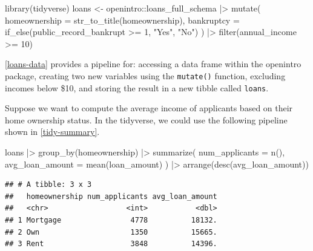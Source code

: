 \documentclass[12pt]{article}
\newenvironment{Shaded}{\begin{snugshade}}{\end{snugshade}}
\newcommand{\AttributeTok}[1]{\textcolor[rgb]{0.77,0.63,0.00}{#1}}
\newcommand{\DecValTok}[1]{\textcolor[rgb]{0.00,0.00,0.81}{#1}}
\newcommand{\FunctionTok}[1]{\textcolor[rgb]{0.00,0.00,0.00}{#1}}
\newcommand{\NormalTok}[1]{#1}
\newcommand{\OtherTok}[1]{\textcolor[rgb]{0.56,0.35,0.01}{#1}}
\newcommand{\SpecialCharTok}[1]{\textcolor[rgb]{0.00,0.00,0.00}{#1}}
\newcommand{\StringTok}[1]{\textcolor[rgb]{0.31,0.60,0.02}{#1}}
\begin{document}
\begin{Shaded}
\begin{Highlighting}[]
\FunctionTok{library}\NormalTok{(tidyverse)}
\NormalTok{loans }\OtherTok{\textless{}{-}}\NormalTok{ openintro}\SpecialCharTok{::}\NormalTok{loans\_full\_schema }\SpecialCharTok{|\textgreater{}}
  \FunctionTok{mutate}\NormalTok{(}
    \AttributeTok{homeownership =} \FunctionTok{str\_to\_title}\NormalTok{(homeownership), }
    \AttributeTok{bankruptcy =} \FunctionTok{if\_else}\NormalTok{(public\_record\_bankrupt }\SpecialCharTok{\textgreater{}=} \DecValTok{1}\NormalTok{, }\StringTok{"Yes"}\NormalTok{, }\StringTok{"No"}\NormalTok{)}
\NormalTok{  ) }\SpecialCharTok{|\textgreater{}}
  \FunctionTok{filter}\NormalTok{(annual\_income }\SpecialCharTok{\textgreater{}=} \DecValTok{10}\NormalTok{)}
\end{Highlighting}
\end{Shaded}


\label{loans-data} \linespread{2}
\vspace{3mm}\setlength{\parindent}{15pt}

\ref{loans-data} provides a pipeline for: accessing a data frame within
the openintro package, creating two new variables using the
\texttt{mutate()} function, excluding incomes below \$10, and storing
the result in a new tibble called \texttt{loans}.

Suppose we want to compute the average income of applicants based on
their home ownership status. In the tidyverse, we could use the
following pipeline shown in \ref{tidy-summary}.

\linespread{1}

\begin{Shaded}
\begin{Highlighting}[]
\NormalTok{loans }\SpecialCharTok{|\textgreater{}}
  \FunctionTok{group\_by}\NormalTok{(homeownership) }\SpecialCharTok{|\textgreater{}}
  \FunctionTok{summarize}\NormalTok{(}
    \AttributeTok{num\_applicants =} \FunctionTok{n}\NormalTok{(),}
    \AttributeTok{avg\_loan\_amount =} \FunctionTok{mean}\NormalTok{(loan\_amount)}
\NormalTok{  ) }\SpecialCharTok{|\textgreater{}}
  \FunctionTok{arrange}\NormalTok{(}\FunctionTok{desc}\NormalTok{(avg\_loan\_amount))}
\end{Highlighting}
\end{Shaded}

\begin{verbatim}
## # A tibble: 3 x 3
##   homeownership num_applicants avg_loan_amount
##   <chr>                  <int>           <dbl>
## 1 Mortgage                4778          18132.
## 2 Own                     1350          15665.
## 3 Rent                    3848          14396.
\end{verbatim}
\end{document}
